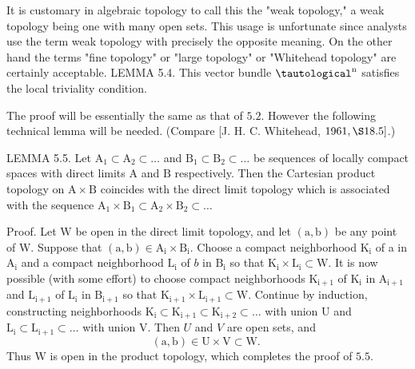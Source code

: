 \documentclass[10pt]{article}
\begin{document}
It is customary in algebraic topology to call this the "weak topology," a weak topology being one with many open sets. This usage is unfortunate since analysts use the term weak topology with precisely the opposite meaning. On the other hand the terms "fine topology" or "large topology" or "Whitehead topology" are certainly acceptable. LEMMA 5.4. This vector bundle $\tautological^{\mathrm{n}}$ satisfies the local triviality condition.

The proof will be essentially the same as that of $5.2$. However the following technical lemma will be needed. (Compare [J. H. C. Whitehead, $1961, \S 18.5]$.)

LEMMA 5.5. Let $\mathrm{A}_{1} \subset \mathrm{A}_{2} \subset \ldots$ and $\mathrm{B}_{1} \subset \mathrm{B}_{2} \subset \ldots$ be sequences of locally compact spaces with direct limits $\mathrm{A}$ and $\mathrm{B}$ respectively. Then the Cartesian product topology on $\mathrm{A} \times \mathrm{B}$ coincides with the direct limit topology which is associated with the sequence $\mathrm{A}_{1} \times \mathrm{B}_{1} \subset \mathrm{A}_{2} \times \mathrm{B}_{2} \subset \ldots$

Proof. Let $\mathrm{W}$ be open in the direct limit topology, and let $(\mathrm{a}, \mathrm{b})$ be any point of $\mathrm{W}$. Suppose that $(\mathrm{a}, \mathrm{b}) \in \mathrm{A}_{\mathrm{i}} \times \mathrm{B}_{\mathrm{i}}$. Choose a compact neighborhood $\mathrm{K}_{\mathrm{i}}$ of a in $\mathrm{A}_{\mathrm{i}}$ and a compact neighborhood $\mathrm{L}_{\mathrm{i}}$ of $b$ in $\mathrm{B}_{\mathrm{i}}$ so that $\mathrm{K}_{\mathrm{i}} \times \mathrm{L}_{\mathrm{i}} \subset \mathrm{W}$. It is now possible (with some effort) to choose compact neighborhoods $\mathrm{K}_{\mathrm{i}+1}$ of $\mathrm{K}_{\mathrm{i}}$ in $\mathrm{A}_{\mathrm{i}+1}$ and $\mathrm{L}_{\mathrm{i}+1}$ of $\mathrm{L}_{\mathrm{i}}$ in $\mathrm{B}_{\mathrm{i}+1}$ so that $\mathrm{K}_{\mathrm{i}+1} \times \mathrm{L}_{\mathrm{i}+1} \subset \mathrm{W}$. Continue by induction, constructing neighborhoods $\mathrm{K}_{\mathrm{i}} \subset \mathrm{K}_{\mathrm{i}+1} \subset \mathrm{K}_{\mathrm{i}+2} \subset \ldots$ with union $\mathrm{U}$ and $\mathrm{L}_{\mathrm{i}} \subset \mathrm{L}_{\mathrm{i}+1} \subset \ldots$ with union $\mathrm{V}$. Then $U$ and $V$ are open sets, and
$$
(\mathrm{a}, \mathrm{b}) \in \mathrm{U} \times \mathrm{V} \subset \mathrm{W} \text {. }
$$
Thus $\mathrm{W}$ is open in the product topology, which completes the proof of $5.5$.
\end{document}

